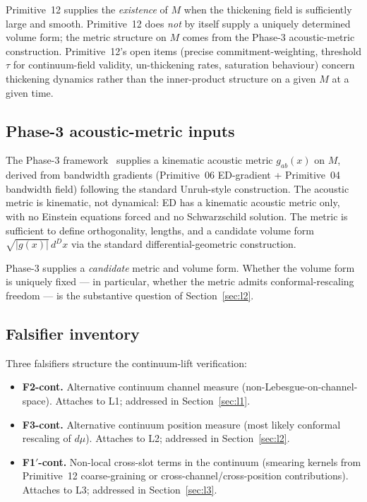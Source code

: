 \documentclass[11pt,a4paper]{article}
\begin{document}
Primitive~12 supplies the \emph{existence} of $M$ when the thickening field is sufficiently large and smooth. Primitive~12 does \emph{not} by itself supply a uniquely determined volume form; the metric structure on $M$ comes from the Phase-3 acoustic-metric construction. Primitive~12's open items (precise commitment-weighting, threshold $\tau$ for continuum-field validity, un-thickening rates, saturation behaviour) concern thickening dynamics rather than the inner-product structure on a given $M$ at a given time.

\subsection{Phase-3 acoustic-metric inputs}

The Phase-3 framework~\cite{phase3} supplies a kinematic acoustic metric $g_{ab}(x)$ on $M$, derived from bandwidth gradients (Primitive~06 ED-gradient + Primitive~04 bandwidth field) following the standard Unruh-style construction. The acoustic metric is kinematic, not dynamical: ED has a kinematic acoustic metric only, with no Einstein equations forced and no Schwarzschild solution. The metric is sufficient to define orthogonality, lengths, and a candidate volume form $\sqrt{|g(x)|} \, d^D x$ via the standard differential-geometric construction.

Phase-3 supplies a \emph{candidate} metric and volume form. Whether the volume form is uniquely fixed --- in particular, whether the metric admits conformal-rescaling freedom --- is the substantive question of Section~\ref{sec:l2}.

\subsection{Falsifier inventory}

Three falsifiers structure the continuum-lift verification:

\begin{itemize}
  \item \textbf{F2-cont.} Alternative continuum channel measure (non-Lebesgue-on-channel-space). Attaches to L1; addressed in Section~\ref{sec:l1}.
  \item \textbf{F3-cont.} Alternative continuum position measure (most likely conformal rescaling of $d\mu$). Attaches to L2; addressed in Section~\ref{sec:l2}.
  \item \textbf{F1$'$-cont.} Non-local cross-slot terms in the continuum (smearing kernels from Primitive~12 coarse-graining or cross-channel/cross-position contributions). Attaches to L3; addressed in Section~\ref{sec:l3}.
\end{itemize}
\end{document}
